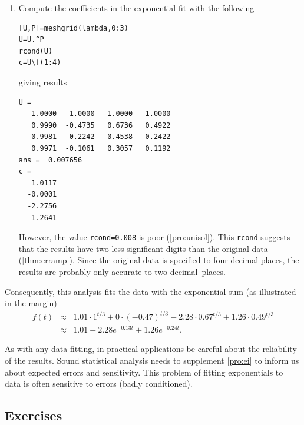 \begin{example}
\begin{solution}
\begin{enumerate}
\item Compute the coefficients in the exponential fit with the following
\begin{verbatim}
[U,P]=meshgrid(lambda,0:3)
U=U.^P
rcond(U)
c=U\f(1:4)
\end{verbatim}
giving results
\begin{verbatim}
U =
   1.0000   1.0000   1.0000   1.0000
   0.9990  -0.4735   0.6736   0.4922
   0.9981   0.2242   0.4538   0.2422
   0.9971  -0.1061   0.3057   0.1192
ans =  0.007656
c =
   1.0117
  -0.0001
  -2.2756
   1.2641
\end{verbatim}
However, the value \verb|rcond=0.008| is poor (\autoref{pro:unisol}).
This \verb|rcond| suggests that the results have two less significant digits than the original data (\autoref{thm:erramp}).
Since the original data is specified to four decimal places, the results are probably only accurate to two decimal~places.
\end{enumerate}
Consequently, this analysis fits the data with the exponential sum (as illustrated in the margin)
%
\begin{eqnarray*}
f(t)&\approx&1.01\cdot1^{t/3}+0\cdot(-0.47)^{t/3}
-2.28\cdot0.67^{t/3}+1.26\cdot0.49^{t/3}
\\&\approx&1.01-2.28e^{-0.13t}+1.26e^{-0.24t}.
\end{eqnarray*}
\end{solution}
\end{example}


As with any data fitting, in practical applications be careful about the reliability of the results.
Sound statistical analysis needs to supplement \autoref{pro:ei} to inform us about expected errors and sensitivity.
This problem of fitting exponentials to data is often sensitive to errors (badly conditioned).











\subsection{Exercises}





